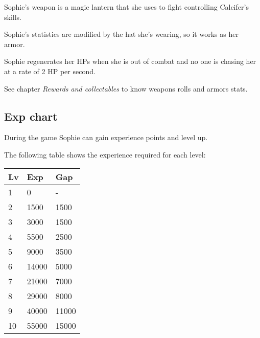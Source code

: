 Sophie's weapon is a magic lantern that she uses to fight controlling Calcifer's skills.

Sophie's statistics are modified by the hat she's wearing, so it works as her armor.

Sophie regenerates her HPs when she is out of combat and no one is chasing her at a rate of 2 HP per second.

See chapter \textit{Rewards and collectables} to know weapons rolls and armors stats.

\subsection{Exp chart}
During the game Sophie can gain experience points and level up.

The following table shows the experience required for each level:
\begin{table}[H]
\centering
\begin{tabular}{|l|l|l|}
\hline
\rowcolor[HTML]{C0C0C0} 
\textbf{Lv} & \textbf{Exp} & \textbf{Gap} \\ \hline
1 & 0 & - \\ \hline
2 & 1500 & 1500 \\ \hline
3 & 3000 & 1500 \\ \hline
4 & 5500 & 2500 \\ \hline
5 & 9000 & 3500 \\ \hline
6 & 14000 & 5000 \\ \hline
7 & 21000 & 7000 \\ \hline
8 & 29000 & 8000 \\ \hline
9 & 40000 & 11000 \\ \hline
10 & 55000 & 15000 \\ \hline
\end{tabular}
\end{table}

